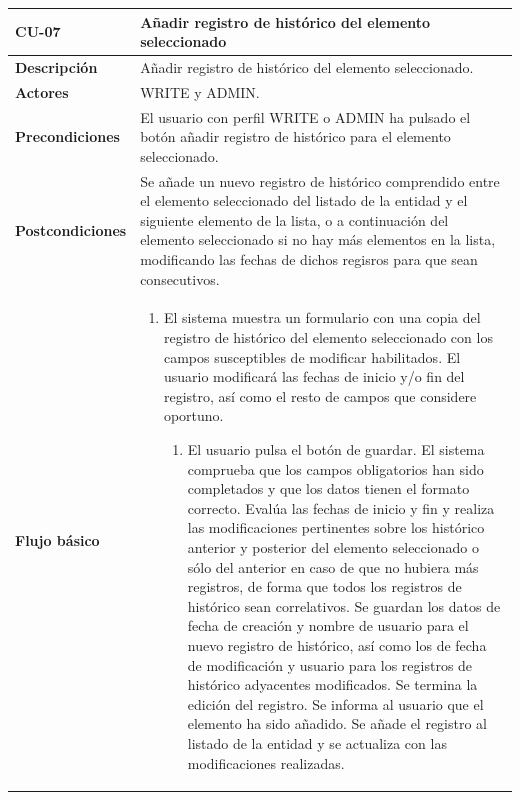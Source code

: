 \begin{table} [H]
    \centering
    \setlength{\leftmargini}{0.4cm}
	\resizebox{14cm}{!} { %
    \begin{tabular}{| m{3cm} | m{11cm} |}   
    \hline
	  \textbf{CU-07} & \textbf{Añadir registro de histórico del elemento seleccionado} \\\hline
	  \textbf{Descripción} & Añadir registro de histórico del elemento seleccionado. \\\hline
	  \textbf{Actores} & WRITE y ADMIN. \\\hline
	  \textbf{Precondiciones} & El usuario con perfil WRITE o ADMIN ha pulsado el botón añadir registro de histórico para el elemento seleccionado. \\\hline
	  \textbf{Postcondiciones} & Se añade un nuevo registro de histórico  comprendido entre el elemento seleccionado del listado de la entidad y el siguiente elemento de la lista, o a continuación del elemento seleccionado si no hay más elementos en la lista, modificando las fechas de dichos regisros para que sean consecutivos. \\\hline
	  \textbf{Flujo básico} & 
		\begin{enumerate}
	  	\item El sistema muestra un formulario con una copia del registro de histórico del elemento seleccionado con los campos susceptibles de modificar habilitados. El usuario modificará las fechas de inicio y/o fin del registro, así como el resto de campos que considere oportuno. 
			\begin{enumerate}	
			   \item El usuario pulsa el botón de guardar. El sistema comprueba que los campos obligatorios han sido completados y que los datos tienen el formato correcto. Evalúa las fechas de inicio y fin y realiza las modificaciones pertinentes sobre los histórico anterior y posterior del elemento seleccionado o sólo del anterior en caso de que no hubiera más registros, de forma que todos los registros de histórico sean correlativos. Se guardan los datos de fecha de creación y nombre de usuario para el nuevo registro de histórico, así como los de fecha de modificación y usuario para los registros de histórico adyacentes modificados. Se termina la edición del registro. Se informa al usuario que el elemento ha sido añadido. Se añade el registro al listado de la entidad y se actualiza con las modificaciones realizadas.

\end{enumerate}
\end{enumerate}
\end{tabular}}
\end{table}

